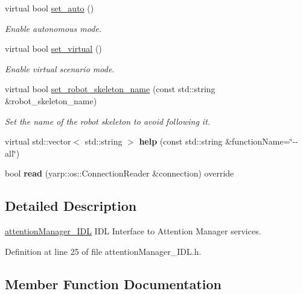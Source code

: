 \begin{DoxyCompactItemize}
virtual bool \mbox{\hyperlink{classattentionManager__IDL_a3c0c61fdb996d2b7378c02e6225a6c20}{set\+\_\+auto}} ()
\begin{DoxyCompactList}\small\item\em Enable autonomous mode. \end{DoxyCompactList}\item 
virtual bool \mbox{\hyperlink{classattentionManager__IDL_a9278a1d0df7c7b1c3b0aa46ef78f8009}{set\+\_\+virtual}} ()
\begin{DoxyCompactList}\small\item\em Enable virtual scenario mode. \end{DoxyCompactList}\item 
virtual bool \mbox{\hyperlink{classattentionManager__IDL_ae50c946fce68f55cac50fe5136e1bc02}{set\+\_\+robot\+\_\+skeleton\+\_\+name}} (const std\+::string \&robot\+\_\+skeleton\+\_\+name)
\begin{DoxyCompactList}\small\item\em Set the name of the robot skeleton to avoid following it. \end{DoxyCompactList}\item 
\mbox{\label{classattentionManager__IDL_ac3c162b2616ec83ecb6f605d79c7b6af}} 
virtual std\+::vector$<$ std\+::string $>$ {\bfseries help} (const std\+::string \&function\+Name=\char`\"{}-\/-\/all\char`\"{})
\item 
\mbox{\label{classattentionManager__IDL_ab7ca0482a77f24b49fa05448fb32ba54}} 
bool {\bfseries read} (yarp\+::os\+::\+Connection\+Reader \&connection) override
\end{DoxyCompactItemize}


\subsection{Detailed Description}
\mbox{\hyperlink{classattentionManager__IDL}{attention\+Manager\+\_\+\+I\+DL}} I\+DL Interface to Attention Manager services. 

Definition at line 25 of file attention\+Manager\+\_\+\+I\+D\+L.\+h.



\subsection{Member Function Documentation}
\mbox{\label{classattentionManager__IDL_ad0b7882cea4dd8b0269cd3eaf0f5dbae}} 
